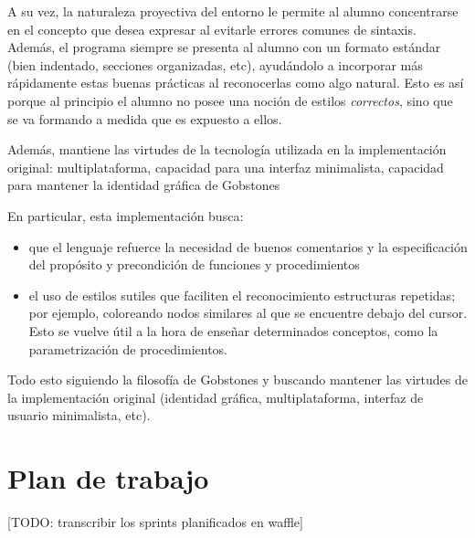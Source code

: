 A su vez, la naturaleza proyectiva del entorno le permite al alumno concentrarse en el concepto que desea expresar al evitarle errores comunes de sintaxis. Además, el programa siempre se presenta al alumno con un formato estándar (bien indentado, secciones organizadas, etc), ayudándolo a incorporar más rápidamente estas buenas prácticas al reconocerlas como algo natural. Esto es así porque al principio el alumno no posee una noción de estilos \textit{correctos}, sino que se va formando a medida que es expuesto a ellos.

Además, mantiene las virtudes de la tecnología utilizada en la implementación original: multiplataforma, capacidad para una interfaz minimalista, capacidad para mantener la identidad gráfica de Gobstones

En particular, esta implementación busca:
\begin{itemize}
  \item que el lenguaje refuerce la necesidad de buenos comentarios y la especificación del propósito y precondición de funciones y procedimientos
  \item el uso de estilos sutiles que faciliten el reconocimiento estructuras repetidas; por ejemplo, coloreando nodos similares al que se encuentre debajo del cursor. Esto se vuelve útil a la hora de enseñar determinados conceptos, como la parametrización de procedimientos.
\end{itemize}

Todo esto siguiendo la filosofía de Gobstones y buscando mantener las virtudes de la implementación original (identidad gráfica, multiplataforma, interfaz de usuario minimalista, etc).

\section{Plan de trabajo}

[TODO: transcribir los sprints planificados en waffle]
